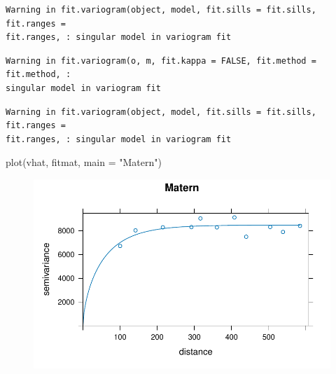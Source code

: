 \documentclass[
  letterpaper,
  DIV=11,
  numbers=noendperiod]{scrartcl}
\newenvironment{Shaded}{\begin{snugshade}}{\end{snugshade}}
\newcommand{\AttributeTok}[1]{\textcolor[rgb]{0.40,0.45,0.13}{#1}}
\newcommand{\FunctionTok}[1]{\textcolor[rgb]{0.28,0.35,0.67}{#1}}
\newcommand{\NormalTok}[1]{\textcolor[rgb]{0.00,0.23,0.31}{#1}}
\newcommand{\StringTok}[1]{\textcolor[rgb]{0.13,0.47,0.30}{#1}}
\begin{document}
\begin{verbatim}
Warning in fit.variogram(object, model, fit.sills = fit.sills, fit.ranges =
fit.ranges, : singular model in variogram fit
\end{verbatim}

\begin{verbatim}
Warning in fit.variogram(o, m, fit.kappa = FALSE, fit.method = fit.method, :
singular model in variogram fit
\end{verbatim}

\begin{verbatim}
Warning in fit.variogram(object, model, fit.sills = fit.sills, fit.ranges =
fit.ranges, : singular model in variogram fit
\end{verbatim}

\begin{Shaded}
\begin{Highlighting}[]
\FunctionTok{plot}\NormalTok{(vhat, fitmat, }\AttributeTok{main =} \StringTok{"Matern"}\NormalTok{)}
\end{Highlighting}
\end{Shaded}

\begin{figure}[H]

{\centering \includegraphics{geo-hw-spdep_files/figure-pdf/unnamed-chunk-4-3.pdf}

}

\end{figure}
\end{document}
